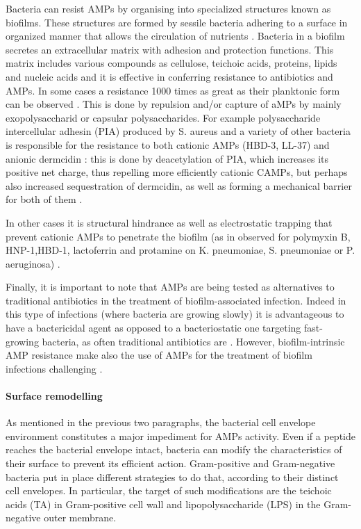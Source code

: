 Bacteria can resist AMPs by organising into specialized structures known as biofilms. These structures are formed by sessile bacteria adhering to a surface in organized manner that allows the circulation of nutrients \cite{Costerton1999}.
Bacteria in a biofilm secretes an extracellular matrix with adhesion and protection functions. This matrix includes various compounds as cellulose, teichoic acids, proteins, lipids and nucleic acids \cite{Jolivet-Gougeon2014}
and it is effective in conferring resistance to antibiotics and AMPs. In some cases a resistance 1000 times as great as their planktonic form can be observed \cite{Nickel1985,Mah2001}.
This is done by repulsion and/or capture of aMPs by mainly exopolysaccharid or capsular polysaccharides.
%
For example polysaccharide intercellular adhesin (PIA) produced by S. aureus and a variety of other bacteria is responsible for the resistance to both cationic AMPs (HBD-3, LL-37) and anionic dermcidin \cite{Wang2004,Vuong2004}:
this is done by deacetylation of PIA, which increases its positive net charge, thus repelling more efficiently cationic CAMPs, but perhaps also increased sequestration of dermcidin, as well as forming a mechanical barrier for both of them \cite{Vuong2004}.

In other cases it is structural hindrance as well as electrostatic trapping that prevent cationic AMPs to penetrate the biofilm (as in observed for polymyxin B, HNP-1,HBD-1, lactoferrin and protamine on K. pneumoniae, S. pneumoniae or P. aeruginosa) \cite{Campos2004,Llobet2008}.

Finally, it is important to note that AMPs are being tested as alternatives to traditional antibiotics in the treatment of biofilm-associated infection. Indeed in this type of infections (where bacteria are growing slowly) it is advantageous to have a bactericidal agent as opposed to a bacteriostatic one targeting fast-growing bacteria, as often traditional antibiotics are \cite{Batoni2011,Strempel2014}.
However, biofilm-intrinsic AMP resistance make also the use of AMPs for the treatment of biofilm infections challenging \cite{Joo2012,DiLuca2014}.

\paragraph{Surface remodelling}
As mentioned in the previous two paragraphs, the bacterial cell envelope environment constitutes a major impediment for AMPs activity.
%
Even if a peptide reaches the bacterial envelope intact, bacteria can modify the characteristics of their surface to prevent its efficient action.
%
Gram-positive and Gram-negative bacteria put in place different strategies to do that, according to their distinct cell envelopes.
%
In particular, the target of such modifications are the teichoic acids (TA) in Gram-positive cell wall and lipopolysaccharide (LPS) in the Gram-negative outer membrane.

